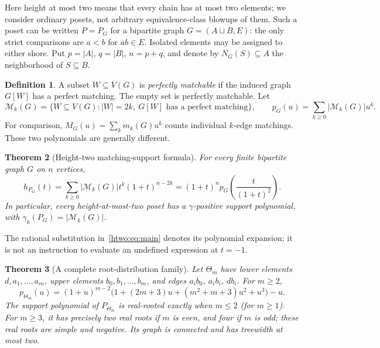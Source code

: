 \documentclass[11pt]{article}
\numberwithin{equation}{section}
\newtheorem{theorem}{Theorem}[section]
\theoremstyle{definition}
\newtheorem{definition}[theorem]{Definition}
\newcommand{\PM}{\mathcal M}
\begin{document}
Here height at most two means that every chain has at most two elements;
we consider ordinary posets, not arbitrary equivalence-class blowups of them.
Such a poset can be written $P=P_G$ for a bipartite graph
$G=(A\sqcup B,E)$: the only strict comparisons are $a<b$ for $ab\in E$.
Isolated elements may be assigned to either shore. Put $p=|A|$, $q=|B|$,
$n=p+q$, and denote by $N_G(S)\subseteq A$ the neighborhood of
$S\subseteq B$.

\begin{definition}
A subset $W\subseteq V(G)$ is \emph{perfectly matchable} if the induced
graph $G[W]$ has a perfect matching. The empty set is perfectly matchable.
Let
\[
 \PM_k(G)=\{W\subseteq V(G):|W|=2k,\ G[W]\text{ has a perfect matching}\},
 \qquad p_G(u)=\sum_{k\ge0}|\PM_k(G)|u^k.
\]
For comparison, $M_G(u)=\sum_k m_k(G)u^k$ counts individual $k$-edge
matchings. These two polynomials are generally different.
\end{definition}

\begin{theorem}[Height-two matching-support formula]\label{htwo:thm:main}
For every finite bipartite graph $G$ on $n$ vertices,
\begin{equation}
 \boxed{\displaystyle
 h_{P_G}(t)=\sum_{k\ge0}|\PM_k(G)|t^k(1+t)^{n-2k}
          =(1+t)^n p_G\!\left(\frac{t}{(1+t)^2}\right).}
 \label{htwo:eq:main}
\end{equation}
In particular, every height-at-most-two poset has a $\gamma$-positive
support polynomial, with $\gamma_k(P_G)=|\PM_k(G)|$.
\end{theorem}
The rational substitution in~\eqref{htwo:eq:main} denotes its polynomial
expansion; it is not an instruction to evaluate an undefined expression at
$t=-1$.

\begin{theorem}[A complete root-distribution family]\label{htwo:thm:thetaintro}
Let $\Theta_m$ have lower elements $d,a_1,\ldots,a_m$, upper elements
$b_0,b_1,\ldots,b_m$, and edges $a_ib_0$, $a_ib_i$, $db_i$.
For $m\ge2$,
\begin{equation}
 p_{\Theta_m}(u)=(1+u)^{m-2}
 \bigl(1+(2m+3)u+(m^2+m+3)u^2+u^3\bigr)-u.
 \label{htwo:eq:thetapoly}
\end{equation}
The support polynomial of $P_{\Theta_m}$ is real-rooted exactly when
$m\le2$ (for $m\ge1$). For $m\ge3$, it has precisely two real roots if
$m$ is even, and four if $m$ is odd; these real roots are simple and negative.
Its graph is connected and has treewidth at most two.
\end{theorem}
\end{document}
